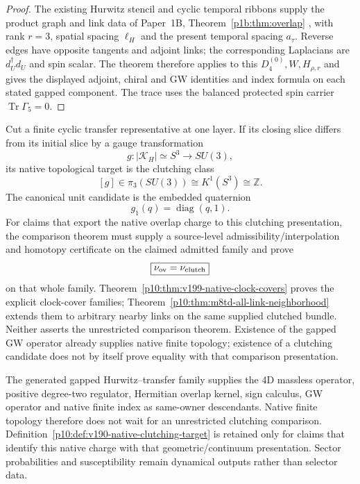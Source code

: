 \documentclass[12pt,a4paper]{article}
\begin{document}
\begin{proof}
The existing Hurwitz stencil and cyclic temporal ribbons supply the
product graph and link data of Paper~1B,
Theorem~\ref{p1b:thm:overlap} \cite{Kugelmann2026Paper1B}, with rank
$r=3$, spatial spacing $\ell_H$ and the present temporal spacing
$a_\tau$. Reverse edges have opposite tangents and adjoint links;
the corresponding Laplacians are $d_U^\dagger d_U$ and spin scalar.
The theorem therefore applies to this $D_4^{(0)},W,H_{\rho,r}$ and
gives the displayed adjoint, chiral and GW identities and index formula
on each stated gapped component. The trace uses the balanced protected
spin carrier $\operatorname{Tr}\Gamma_5=0$.
\end{proof}

\begin{definition}
\label{p10:def:v190-native-clutching-target}
Cut a finite cyclic transfer representative at one layer.  If its closing
slice differs from its initial slice by a gauge transformation
\[
 g:|\mathcal K_H|\simeq S^3\longrightarrow SU(3),
\]
its native topological target is the clutching class
\[
 [g]\in\pi_3(SU(3))\cong K^1(S^3)\cong\mathbb Z.
\]
The canonical unit candidate is the embedded quaternion
\[
 \boxed{g_1(q)=\operatorname{diag}(q,1).}
\]
For claims that export the native overlap charge to this clutching presentation,
the comparison theorem must supply a source-level admissibility/interpolation
and homotopy certificate on the claimed admitted family and prove
\[
 \boxed{\nu_{\rm ov}=\nu_{\rm clutch}}
\]
on that whole family. Theorem~\ref{p10:thm:v199-native-clock-covers} proves the explicit clock-cover families; Theorem~\ref{p10:thm:m8td-all-link-neighborhood} extends them to arbitrary nearby links on the same supplied clutched bundle. Neither asserts the unrestricted comparison theorem.  Existence of the gapped GW operator already supplies native finite topology; existence of a clutching candidate does not by itself prove equality with that comparison presentation.
\end{definition}

\begin{corollary}
\label{p10:cor:v190-g20-finite-regulator-generated}
The generated gapped Hurwitz--transfer family supplies the 4D massless operator,
positive degree-two regulator, Hermitian overlap kernel, sign calculus, GW
operator and native finite index as same-owner descendants.  Native finite
topology therefore does not wait for an unrestricted clutching comparison.
Definition~\ref{p10:def:v190-native-clutching-target} is retained only for
claims that identify this native charge with that geometric/continuum
presentation.  Sector probabilities and susceptibility remain dynamical
outputs rather than selector data.
\end{corollary}
\end{document}

